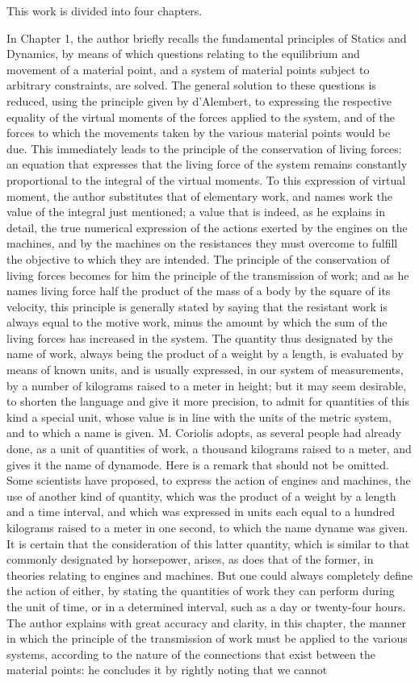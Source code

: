 \documentclass{book}
\begin{document}
This work is divided into four chapters.

In Chapter 1, the author briefly recalls the fundamental principles of Statics and Dynamics, by means of which questions relating to the equilibrium and movement of a material point, and a system of material points subject to arbitrary constraints, are solved. The general solution to these questions is reduced, using the principle given by d'Alembert, to expressing the respective equality of the virtual moments of the forces applied to the system, and of the forces to which the movements taken by the various material points would be due. This immediately leads to the principle of the conservation of living forces: an equation that expresses that the living force of the system remains constantly proportional to the integral of the virtual moments. To this expression of virtual moment, the author substitutes that of elementary work, and names work the value of the integral just mentioned; a value that is indeed, as he explains in detail, the true numerical expression of the actions exerted by the engines on the machines, and by the machines on the resistances they must overcome to fulfill the objective to which they are intended. The principle of the conservation of living forces becomes for him the principle of the transmission of work; and as he names living force half the product of the mass of a body by the square of its velocity, this principle is generally stated by saying that the resistant work is always equal to the motive work, minus the amount by which the sum of the living forces has increased in the system. The quantity thus designated by the name of work, always being the product of a weight by a length, is evaluated by means of known units, and is usually expressed, in our system of measurements, by a number of kilograms raised to a meter in height; but it may seem desirable, to shorten the language and give it more precision, to admit for quantities of this kind a special unit, whose value is in line with the units of the metric system, and to which a name is given. M. Coriolis adopts, as several people had already done, as a unit of quantities of work, a thousand kilograms raised to a meter, and gives it the name of dynamode. Here is a remark that should not be omitted. Some scientists have proposed, to express the action of engines and machines, the use of another kind of quantity, which was the product of a weight by a length and a time interval, and which was expressed in units each equal to a hundred kilograms raised to a meter in one second, to which the name dyname was given. It is certain that the consideration of this latter quantity, which is similar to that commonly designated by horsepower, arises, as does that of the former, in theories relating to engines and machines. But one could always completely define the action of either, by stating the quantities of work they can perform during the unit of time, or in a determined interval, such as a day or twenty-four hours. The author explains with great accuracy and clarity, in this chapter, the manner in which the principle of the transmission of work must be applied to the various systems, according to the nature of the connections that exist between the material points: he concludes it by rightly noting that we cannot 
\end{document}
